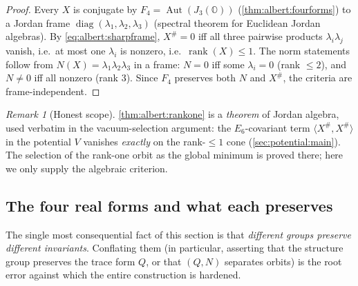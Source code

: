 \documentclass[11pt]{article}
\theoremstyle{plain}
\theoremstyle{definition}
\theoremstyle{remark}
\newtheorem{remark}[theorem]{Remark}
\begin{document}
\begin{proof}
Every $X$ is conjugate by $F_{4}=\operatorname{Aut}(J_{3}(\mathbb{O}))$
(\autoref{thm:albert:fourforms}) to a Jordan frame
$\operatorname{diag}(\lambda_{1},\lambda_{2},\lambda_{3})$
(spectral theorem for Euclidean Jordan algebras). By
\eqref{eq:albert:sharpframe}, $X^{\#}=0$ iff all three pairwise products
$\lambda_{i}\lambda_{j}$ vanish, i.e.\ at most one $\lambda_{i}$ is
nonzero, i.e.\ $\operatorname{rank}(X)\le1$. The norm statements follow
from $N(X)=\lambda_{1}\lambda_{2}\lambda_{3}$ in a frame: $N=0$ iff some
$\lambda_{i}=0$ (rank $\le 2$), and $N\neq0$ iff all nonzero (rank $3$).
Since $F_{4}$ preserves both $N$ and $X^{\#}$, the criteria are
frame-independent.
\end{proof}

\begin{remark}[Honest scope]\label{rmk:albert:scope}
\autoref{thm:albert:rankone} is a \emph{theorem} of Jordan algebra, used
verbatim in the vacuum-selection argument: the $E_{6}$-covariant term
$\langle X^{\#},X^{\#}\rangle$ in the potential $V$ vanishes
\emph{exactly} on the rank-$\le1$ cone (\autoref{sec:potential:main}).
The selection of the rank-one orbit as the global minimum is proved
there; here we only supply the algebraic criterion.
\end{remark}

\subsection{The four real forms and what each preserves}
\label{sec:albert:groups}
\label{sec:foundation:realform}
\label{sec:foundations:realform}
\label{sec:realform:main}

The single most consequential fact of this section is that
\emph{different groups preserve different invariants}. Conflating them
(in particular, asserting that the structure group preserves the trace
form $Q$, or that $(Q,N)$ separates orbits) is the root error against
which the entire construction is hardened.
\end{document}
